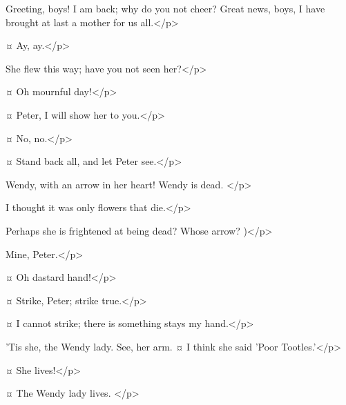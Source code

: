 \begin{drama}

\peterspeaks
Greeting, boys!
I am back; why do you not cheer?
Great news, boys, I have brought at last a mother for us all.</p>

\slightlyspeaks {}¤
Ay, ay.</p>

\peterspeaks
She flew this way; have you not seen her?</p>

\secondtwinspeaks {}¤
Oh mournful day!</p>

\tootlesspeaks {}¤
Peter, I will show her to you.</p>

 ¤
No, no.</p>

\tootlesspeaks {}¤
Stand back all, and let Peter see.</p>


\peterspeaks
Wendy, with an arrow in her heart!
Wendy is dead.
</p>

\curlyspeaks
I thought it was only flowers that die.</p>

\peterspeaks
Perhaps she is frightened at being dead?
Whose arrow?
)</p>

\tootlesspeaks
Mine, Peter.</p>

\peterspeaks {}¤
Oh dastard hand!</p>

\tootlesspeaks {}¤
Strike, Peter; strike true.</p>

\peterspeaks {}¤
I cannot strike; there is something stays my hand.</p>


\nibsspeaks
'Tis she, the Wendy lady.
See, her arm.
¤
I think she said 'Poor Tootles.'</p>

\peterspeaks {}¤
She lives!</p>

\slightlyspeaks {}¤
The Wendy lady lives.
</p>


\end{drama}
